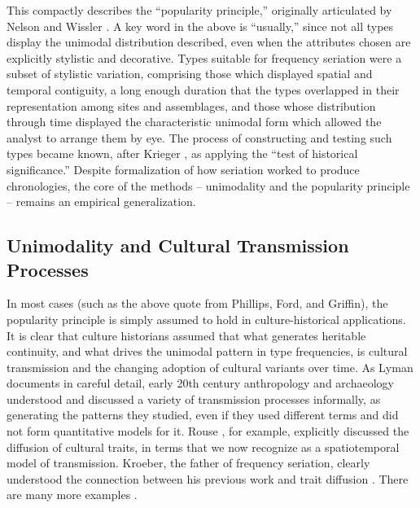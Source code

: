 \documentclass[graybox,natbib]{svmult}
\begin{document}
This compactly describes the ``popularity principle,'' originally
articulated by Nelson \citeyearpar{Nelson1916} and Wissler
\citeyearpar{wissler1916application}. A key word in the above is
``usually,'' since not all types display the unimodal distribution
described, even when the attributes chosen are explicitly stylistic and
decorative. Types suitable for frequency seriation were a subset of
stylistic variation, comprising those which displayed spatial and
temporal contiguity, a long enough duration that the types overlapped in
their representation among sites and assemblages, and those whose
distribution through time displayed the characteristic unimodal form
which allowed the analyst to arrange them by eye. The process of
constructing and testing such types became known, after Krieger
\citeyearpar{Krieger1944}, as applying the ``test of historical
significance.'' Despite formalization of how seriation worked to produce
chronologies, the core of the methods -- unimodality and the popularity
principle -- remains an empirical generalization.

\subsection{Unimodality and Cultural Transmission
Processes}\label{unimodality-and-cultural-transmission-processes}

In most cases (such as the above quote from Phillips, Ford, and
Griffin), the popularity principle is simply assumed to hold in
culture-historical applications. It is clear that culture historians
assumed that what generates heritable continuity, and what drives the
unimodal pattern in type frequencies, is cultural transmission and the
changing adoption of cultural variants over time. As Lyman
\citeyearpar{Lyman2008} documents in careful detail, early 20th century
anthropology and archaeology understood and discussed a variety of
transmission processes informally, as generating the patterns they
studied, even if they used different terms and did not form quantitative
models for it. Rouse \citeyearpar{Rouse1939}, for example, explicitly
discussed the diffusion of cultural traits, in terms that we now
recognize as a spatiotemporal model of transmission. Kroeber, the father
of frequency seriation, clearly understood the connection between his
previous work and trait diffusion \citep{kroeber1937diffusion}. There
are many more examples \citep{Lyman2008}.
\end{document}
